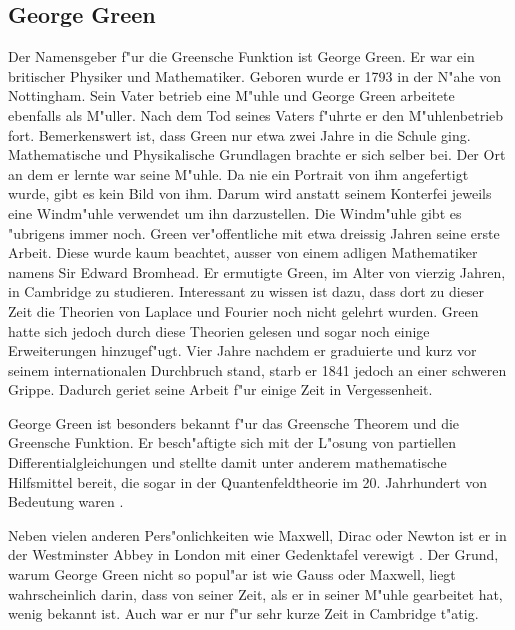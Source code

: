 \begin{refsection}
\section{George Green}
Der Namensgeber f"ur die Greensche Funktion ist George Green. Er
war ein britischer Physiker und Mathematiker. Geboren wurde er 1793
in der N"ahe von Nottingham. Sein Vater betrieb eine M"uhle und
George Green arbeitete ebenfalls als M"uller. Nach dem Tod seines
Vaters f"uhrte er den M"uhlenbetrieb fort. Bemerkenswert ist, dass
Green nur etwa zwei Jahre in die Schule ging. Mathematische und
Physikalische Grundlagen brachte er sich selber bei. Der Ort an dem
er lernte war seine M"uhle. Da nie ein Portrait von ihm angefertigt
wurde, gibt es kein Bild von ihm. Darum wird anstatt seinem Konterfei
jeweils eine Windm"uhle verwendet um ihn darzustellen. Die Windm"uhle
gibt es "ubrigens immer noch. Green ver"offentliche mit etwa dreissig
Jahren seine erste Arbeit. Diese wurde kaum beachtet, ausser von
einem adligen Mathematiker namens Sir Edward Bromhead. Er ermutigte
Green, im Alter von vierzig Jahren, in Cambridge zu studieren.
Interessant zu wissen ist dazu, dass dort zu dieser Zeit die Theorien
von Laplace und Fourier noch nicht gelehrt wurden. Green hatte sich
jedoch durch diese Theorien gelesen und sogar noch einige Erweiterungen
hinzugef"ugt. Vier Jahre nachdem er graduierte und kurz vor seinem
internationalen Durchbruch stand, starb er 1841 jedoch an einer
schweren Grippe. Dadurch geriet seine Arbeit f"ur einige Zeit in
Vergessenheit.
	
George Green ist besonders bekannt f"ur das Greensche Theorem und
die Greensche Funktion. Er besch"aftigte sich mit der L"osung von
partiellen Differentialgleichungen und stellte damit unter anderem
mathematische Hilfsmittel bereit, die sogar in der Quantenfeldtheorie
im 20. Jahrhundert von Bedeutung waren \cite{wiki:green}.
	
Neben vielen anderen Pers"onlichkeiten wie Maxwell, Dirac oder
Newton ist er in der Westminster Abbey in London mit einer Gedenktafel
verewigt \cite{wiki:westminster}. Der Grund, warum George Green nicht
so popul"ar ist wie Gauss oder Maxwell, liegt wahrscheinlich darin,
dass von seiner Zeit, als er in seiner M"uhle gearbeitet hat, wenig
bekannt ist. Auch war er nur f"ur sehr kurze Zeit in Cambridge
t"atig.


\end{refsection}
